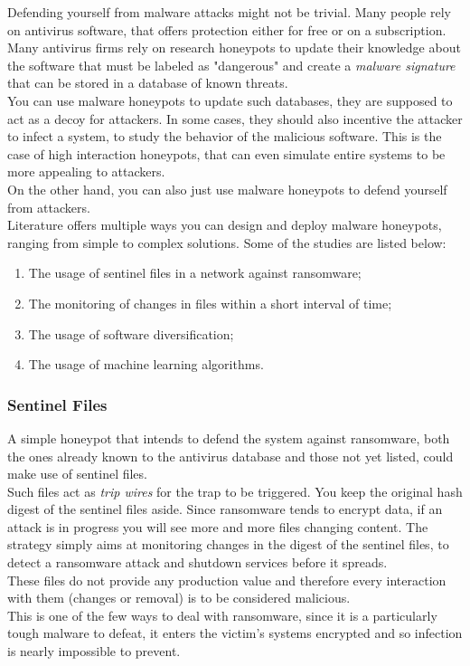 Defending yourself from malware attacks might not be trivial. Many people rely on antivirus software, that offers protection either for free or on a subscription.\\
Many antivirus firms rely on research honeypots to update their knowledge about the software that must be labeled as "dangerous" and create a \textit{malware signature} that can be stored in a database of known threats.\\
You can use malware honeypots to update such databases, they are supposed to act as a decoy for attackers. In some cases, they should also incentive the attacker to infect a system, to study the behavior of the malicious software. This is the case of high interaction honeypots, that can even simulate entire systems to be more appealing to attackers.\\
On the other hand, you can also just use malware honeypots to defend yourself from attackers.\\
Literature offers multiple ways you can design and deploy malware honeypots, ranging from simple to complex solutions. Some of the studies are listed below:
\begin{enumerate}
\item The usage of sentinel files in a network against ransomware;
\item The monitoring of changes in files within a short interval of time;
\item The usage of software diversification;
\item The usage of machine learning algorithms.
\end{enumerate}

\subsubsection{Sentinel Files}
A simple honeypot that intends to defend the system against ransomware, both the ones already known to the antivirus database and those not yet listed, could make use of sentinel files.\\
Such files act as \textit{trip wires} for the trap to be triggered. You keep the original hash digest of the sentinel files aside. Since ransomware tends to encrypt data, if an attack is in progress you will see more and more files changing content.
The strategy simply aims at monitoring changes in the digest of the sentinel files, to detect a ransomware attack and shutdown services before it spreads.\\
These files do not provide any production value and therefore every interaction with them (changes or removal) is to be considered malicious.\\
This is one of the few ways to deal with ransomware, since it is a particularly tough malware to defeat, it enters the victim's systems encrypted and so infection is nearly impossible to prevent.


